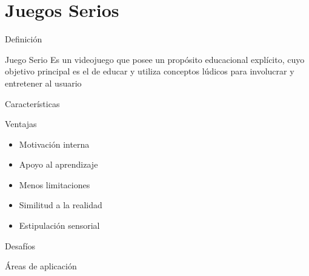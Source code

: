 
\section{Juegos Serios}

\begin{frame}{Definición}
    \begin{block}{Juego Serio}
    \centering
    Es un videojuego que posee un propósito educacional explícito, cuyo objetivo
    principal es el de educar y utiliza conceptos lúdicos para involucrar y
    entretener al usuario
    \end{block}
\end{frame}
\begin{frame}{Características}
\end{frame}

\begin{frame}{Ventajas}
    \begin{itemize}[<+->]
        \item Motivación interna
        \item Apoyo al aprendizaje
        \item Menos limitaciones
        \item Similitud a la realidad
        \item Estipulación sensorial
    \end{itemize}
\end{frame}
\begin{frame}{Desafíos}
\end{frame}
\begin{frame}{Áreas de aplicación}
\end{frame}

